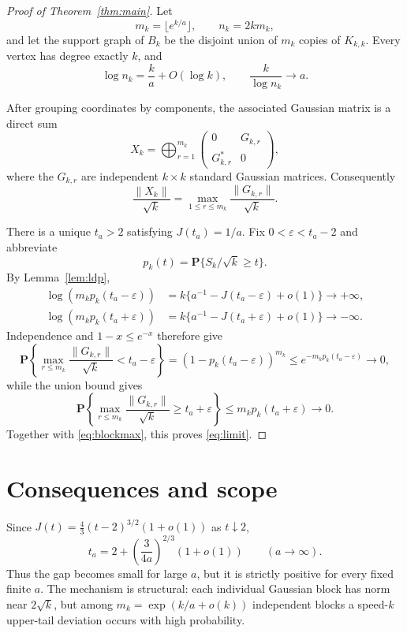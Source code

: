 \documentclass[11pt]{article}
\newcommand{\Pp}{\mathbf P}
\begin{document}
\begin{proof}[Proof of Theorem~\ref{thm:main}]
Let
\[
 m_k=\lfloor e^{k/a}\rfloor,
 \qquad n_k=2km_k,
\]
and let the support graph of $B_k$ be the disjoint union of $m_k$ copies of
$K_{k,k}$.  Every vertex has degree exactly $k$, and
\[
 \log n_k=\frac{k}{a}+O(\log k),
 \qquad \frac{k}{\log n_k}\longrightarrow a.
\]

After grouping coordinates by components, the associated Gaussian matrix
is a direct sum
\[
 X_k=\bigoplus_{r=1}^{m_k}
 \begin{pmatrix}0&G_{k,r}\\G_{k,r}^*&0\end{pmatrix},
\]
where the $G_{k,r}$ are independent $k\times k$ standard Gaussian matrices.
Consequently
\begin{equation}
 \frac{\|X_k\|}{\sqrt{k}}
 =\max_{1\le r\le m_k}\frac{\|G_{k,r}\|}{\sqrt{k}}.
 \label{eq:blockmax}
\end{equation}

There is a unique $t_a>2$ satisfying $J(t_a)=1/a$.  Fix
$0<\varepsilon<t_a-2$ and abbreviate
\[
 p_k(t)=\Pp\{S_k/\sqrt{k}\ge t\}.
\]
By Lemma~\ref{lem:ldp},
\begin{align*}
 \log(m_kp_k(t_a-\varepsilon))
 &=k\{a^{-1}-J(t_a-\varepsilon)+o(1)\}\longrightarrow+\infty,\\
 \log(m_kp_k(t_a+\varepsilon))
 &=k\{a^{-1}-J(t_a+\varepsilon)+o(1)\}\longrightarrow-\infty.
\end{align*}
Independence and $1-x\le e^{-x}$ therefore give
\[
 \Pp\left\{\max_{r\le m_k}\frac{\|G_{k,r}\|}{\sqrt{k}}
       <t_a-\varepsilon\right\}
 =(1-p_k(t_a-\varepsilon))^{m_k}
 \le e^{-m_kp_k(t_a-\varepsilon)}\longrightarrow0,
\]
while the union bound gives
\[
 \Pp\left\{\max_{r\le m_k}\frac{\|G_{k,r}\|}{\sqrt{k}}
       \ge t_a+\varepsilon\right\}
 \le m_kp_k(t_a+\varepsilon)\longrightarrow0.
\]
Together with \eqref{eq:blockmax}, this proves \eqref{eq:limit}.
\end{proof}

\section{Consequences and scope}

Since $J(t)=\frac43(t-2)^{3/2}(1+o(1))$ as $t\downarrow2$,
\begin{equation}
 t_a=2+\left(\frac{3}{4a}\right)^{2/3}(1+o(1))
 \qquad(a\to\infty).
\end{equation}
Thus the gap becomes small for large $a$, but it is strictly positive for
every fixed finite $a$.  The mechanism is structural: each individual
Gaussian block has norm near $2\sqrt{k}$, but among
$m_k=\exp(k/a+o(k))$ independent blocks a speed-$k$ upper-tail deviation
occurs with high probability.
\end{document}
